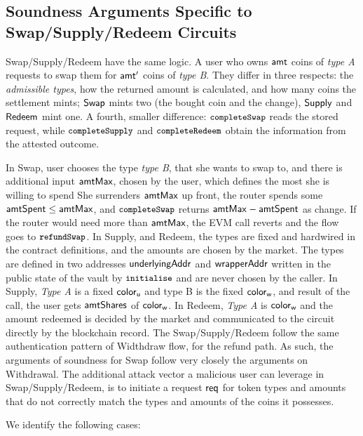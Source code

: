 \subsection{Soundness Arguments Specific to Swap/Supply/Redeem Circuits}
\label{susec:soundnessrest}

Swap/Supply/Redeem have the same logic.
A user who owns $\mathsf{amt}$ coins of \emph{type A} requests to swap them
for $\mathsf{amt}'$ coins of \emph{type B}.
They differ in three respects: the \emph{admissible types}, how the returned amount is calculated,
and how many coins the settlement mints; $\mathsf{Swap}$ mints two (the bought coin and the change),
$\mathsf{Supply}$ and $\mathsf{Redeem}$ mint one.
A fourth, smaller difference: $\texttt{\small completeSwap}$ reads the stored
request, while $\texttt{\small completeSupply}$ and $\texttt{\small completeRedeem}$ obtain the information from
the attested outcome.

In Swap,  user chooses the type \emph{type B}, that  she wants to swap to,  and there is additional input $\mathsf{amtMax}$,  chosen by the user, which  defines  the most she is willing to spend
She surrenders $\mathsf{amtMax}$ up front, the router spends some
$\mathsf{amtSpent} \leq \mathsf{amtMax}$, and $\texttt{\small completeSwap}$ returns $\mathsf{amtMax} - \mathsf{amtSpent}$ as change. If the
router would need more than $\mathsf{amtMax}$, the EVM call reverts and the flow goes to $\texttt{\small refundSwap}$.
In Supply, and Redeem, the types are fixed and hardwired in the contract definitions, and the amounts  are chosen by the market.
The types are defined in two addresses $\mathsf{underlyingAddr}$ and $\mathsf{wrapperAddr}$ written in the public state of the vault by $\texttt{\small initialise}$ and are  never chosen by the caller.
In Supply,  \emph{Type A} is a fixed $\mathsf{color}_{\mathsf{u}}$  and type B is the fixed $\mathsf{color}_{\mathsf{w}}$, and result of the call, the user gets  $\mathsf{amtShares}$ of $\mathsf{color}_{\mathsf{w}}$.
In Redeem,  \emph{Type A} is $\mathsf{color}_{\mathsf{w}}$  and the amount redeemed  is decided by the market and communicated to the circuit directly by the blockchain record.
The Swap/Supply/Redeem   follow  the same authentication pattern of Widthdraw flow, for the refund path. As such, the  arguments of soundness for  Swap  follow very closely the arguments on Withdrawal. The additional attack vector a  malicious user can leverage in Swap/Supply/Redeem, is to initiate a request $\mathsf{req}$ for token types and amounts that do not correctly match the types and amounts of the coins it possesses.

We identify the following cases:
%

